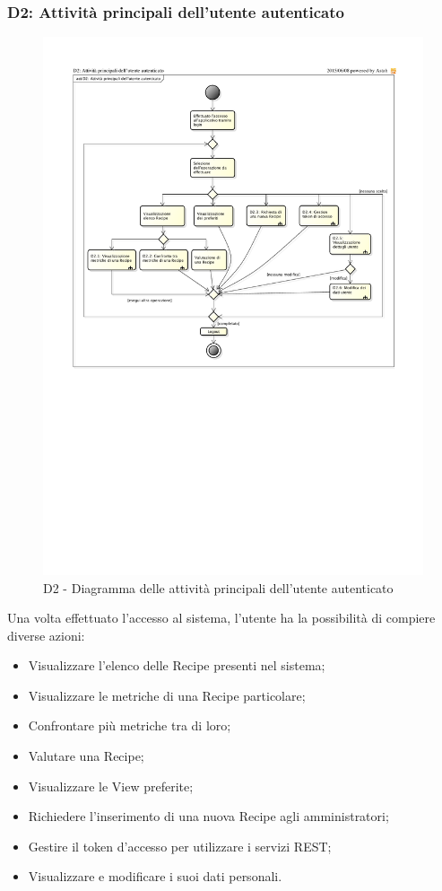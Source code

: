 		\subsubsection{D2: Attività principali dell'utente autenticato} %
		\label{ssub:attivita_principali_dell_utente_autenticato}
		\begin{figure}[!htbp]
			\centering
			\centerline{\includegraphics[scale=0.70]{./images/D2.pdf}}
			\caption{D2 - Diagramma delle attività principali dell'utente autenticato}
		\end{figure}
		\noindent
		Una volta effettuato l'accesso al sistema, l'utente ha la possibilità di compiere diverse azioni:
			\begin{itemize}
				\item Visualizzare l'elenco delle Recipe presenti nel sistema;
				\item Visualizzare le metriche di una Recipe particolare;
				\item Confrontare più metriche tra di loro;
				\item Valutare una Recipe;
				\item Visualizzare le View preferite;
				\item Richiedere l'inserimento di una nuova Recipe agli amministratori;
				\item Gestire il token d'accesso per utilizzare i servizi REST;
				\item Visualizzare e modificare i suoi dati personali.
			\end{itemize}
